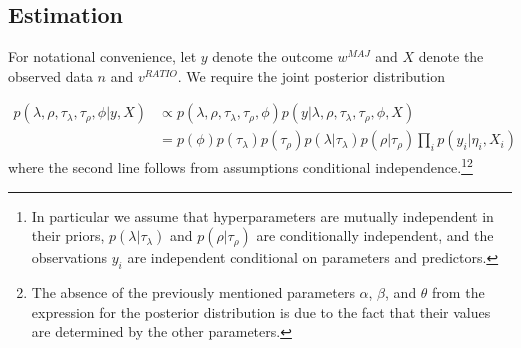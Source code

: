 %
%



\subsection{Estimation}

For notational convenience, let $y$ denote the outcome $w^{MAJ}$ and $X$ denote the observed data $n$ and $v^{RATIO}$. We require the joint posterior distribution

{\singlespacing
\begin{align*}
p(\lambda, \rho, \tau_\lambda, \tau_\rho, \phi | y, X) & \propto p(\lambda, \rho, \tau_\lambda, \tau_\rho, \phi) p(y | \lambda, \rho, \tau_\lambda, \tau_\rho, \phi,  X)  \\
& = p(\phi) p(\tau_\lambda) p(\tau_\rho)  p(\lambda | \tau_\lambda) p(\rho | \tau_\rho) \prod_i p(y_i | \eta_i, X_i) 
\end{align*}
}
%
\noindent where the second line follows from assumptions conditional independence.\footnote{In particular we assume that hyperparameters are mutually independent in their priors, $p(\lambda | \tau_\lambda)$ and $p(\rho | \tau_\rho)$ are conditionally independent, and the observations $y_i$ are independent conditional on parameters and predictors.}\footnote{The absence of the previously mentioned parameters $\alpha$, $\beta$, and $\theta$ from the expression for the posterior distribution is due to the fact that their values are determined by the other parameters.} 

